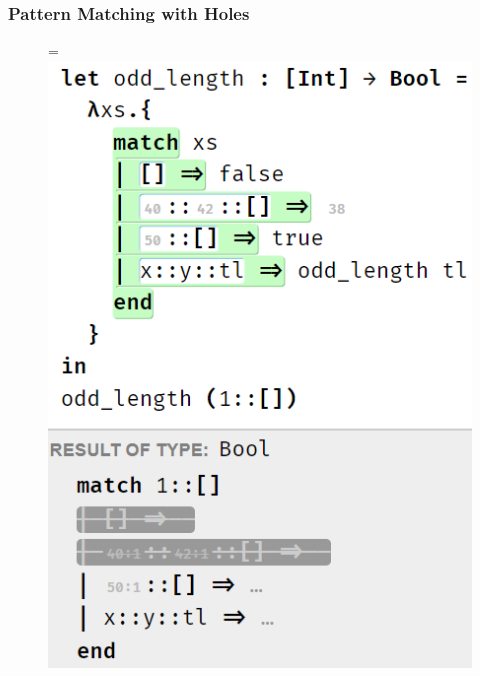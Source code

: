 \documentclass{beamer}
\begin{document}
\begin{frame}
\frametitle{Pattern Matching with Holes}
\begin{figure}
	\centering
	=\hbox{\includegraphics[scale=0.5]{imgs/pat_match_pat_holes.png}}%
\end{figure}
\end{frame}
\end{document}
